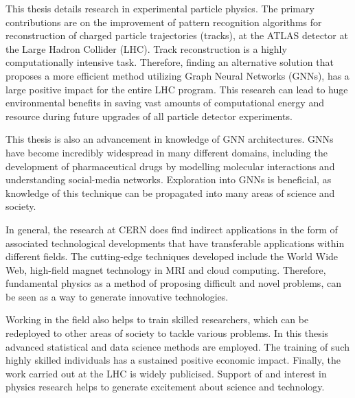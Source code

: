 This thesis details research in experimental particle physics. The primary contributions are on the improvement of pattern recognition algorithms for reconstruction of charged particle trajectories (tracks), at the ATLAS detector at the Large Hadron Collider (LHC). Track reconstruction is a highly computationally intensive task. Therefore, finding an alternative solution that proposes a more efficient method utilizing Graph Neural Networks (GNNs), has a large positive impact for the entire LHC program. This research can lead to huge environmental benefits in saving vast amounts of computational energy and resource during future upgrades of all particle detector experiments.

This thesis is also an advancement in knowledge of GNN architectures. GNNs have become incredibly widespread in many different domains, including the development of pharmaceutical drugs by modelling molecular interactions and understanding social-media networks. Exploration into GNNs is beneficial, as knowledge of this technique can be propagated into many areas of science and society.

In general, the research at CERN does find indirect applications in the form of associated technological developments that have transferable applications within different fields. The cutting-edge techniques developed include the World Wide Web, high-field magnet technology in MRI and cloud computing. Therefore, fundamental physics as a method of proposing difficult and novel problems, can be seen as a way to generate innovative technologies.

Working in the field also helps to train skilled researchers, which can be redeployed to other areas of society to tackle various problems. In this thesis advanced statistical and data science methods are employed. The training of such highly skilled individuals has a sustained positive economic impact. Finally, the work carried out at the LHC is widely publicised. Support of and interest in physics research helps to generate excitement about science and technology.
